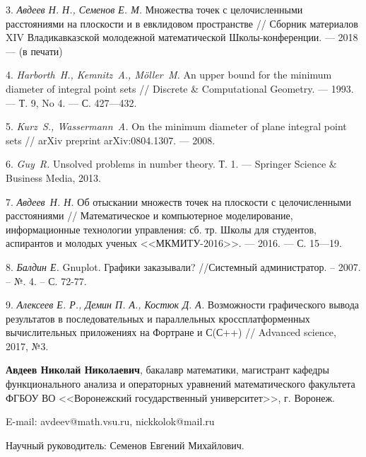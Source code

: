 \documentclass[12pt]{article}
\begin{document}
3.	\emph{Авдеев Н. Н., Семенов Е. М.}
	Множества точек с целочисленными расстояниями на плоскости и в евклидовом пространстве
	//
	Сборник материалов XIV Владикавказской молодежной математической Школы-конференции.
	--- 2018 --- (в печати)

4.	\emph{Harborth~H.,
	Kemnitz~A.,
	M\"{o}ller~M.}
	An upper bound for the minimum diameter of integral point sets
	/\!/ Discrete \& Computational Geometry. --- 1993. --- Т. 9, No 4.
	--- С. 427---432.

5.	\emph{Kurz~S., Wassermann~A.}
	On the minimum diameter of plane integral point sets /\!/ arXiv
	preprint arXiv:0804.1307. --- 2008.

6.	\emph{Guy~R.} Unsolved problems in number theory. Т.
	1. --- Springer Science \& Business Media, 2013.

7.	\emph{Авдеев~Н. Н.} Об отыскании множеств точек на
	плоскости с целочисленными расстояниями /\!/ Математическое
	и компьютерное моделирование, информационные технологии
	управления: сб. тр. Школы для студентов, аспирантов и
	молодых ученых <<МКМИТУ-2016>>. --- 2016. --- С. 15---19.

8.	\emph{Балдин Е.} Gnuplot. Графики заказывали? //Системный администратор. – 2007. – №. 4. – С. 72-77.

9.	\emph{Алексеев Е. Р., Демин П. А., Костюк Д. А.} Возможности графического вывода результатов в последовательных и
	параллельных кроссплатформенных вычислительных приложениях на Фортране и С(С++) // Advanced science, 2017, №3.



{\bf Авдеев Николай Николаевич},
бакалавр математики, магистрант кафедры функционального анализа и операторных уравнений математического факультета
ФГБОУ ВО <<Воронежский государственный университет>>, г. Воронеж.

E-mail: avdeev@math.vsu.ru, nickkolok@mail.ru

Научный руководитель: Семенов Евгений Михайлович.
\end{document}
